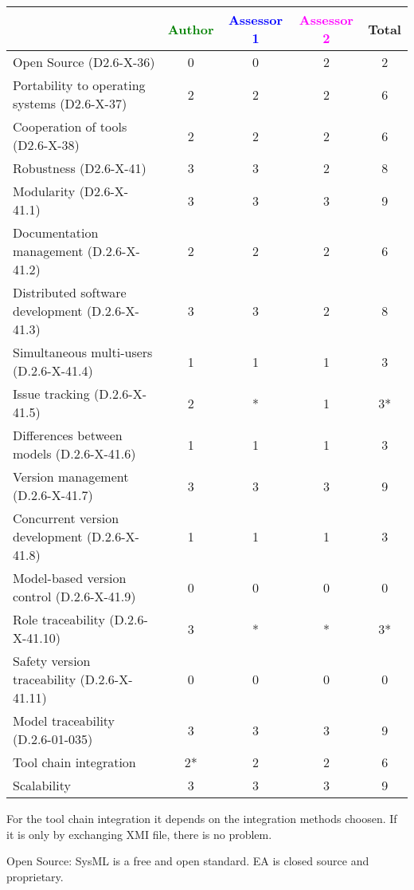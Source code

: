 \begin{tabular}{|l | c | c | c | c|}
\hline
& \textcolor{green}{Author} & \textcolor{blue}{Assessor 1} & \textcolor{magenta}{Assessor 2} & Total \\
\hline 
Open Source (D2.6-X-36) &0 & 0& 2& 2  \\
\hline 
Portability to operating systems (D2.6-X-37) &2 & 2& 2 & 6  \\
\hline
Cooperation of tools (D2.6-X-38) &2 & 2&2 & 6  \\
\hline
Robustness (D2.6-X-41) &3 &3 &2 & 8 \\
\hline
Modularity (D2.6-X-41.1) &3 &3 &3 & 9 \\
\hline
Documentation management (D.2.6-X-41.2) & 2& 2&2 & 6 \\
\hline
Distributed software development (D.2.6-X-41.3)  &3 & 3&2 & 8 \\
\hline
Simultaneous multi-users (D.2.6-X-41.4)   &1 & 1&1 & 3 \\
\hline
Issue tracking (D.2.6-X-41.5) &2 & *& 1& 3* \\
\hline
Differences between models (D.2.6-X-41.6) &1 & 1&1 & 3 \\
\hline
Version management (D.2.6-X-41.7) &3 & 3& 3& 9 \\
\hline
Concurrent version development (D.2.6-X-41.8) &1 & 1& 1& 3 \\
\hline
Model-based version control (D.2.6-X-41.9) &0 & 0& 0& 0 \\
\hline
Role traceability (D.2.6-X-41.10) & 3& *& * & 3* \\
\hline
Safety version traceability (D.2.6-X-41.11) &0 &0 & 0& 0 \\
\hline
Model traceability (D.2.6-01-035) &3 & 3&3 & 9 \\
\hline
Tool chain integration &2* & 2& 2 & 6 \\
\hline
Scalability &3 & 3&3 & 9 \\
\hline
\end{tabular}
\begin{author_comment}
For the tool chain integration it depends on the integration methods
choosen. If it is only by exchanging XMI file, there is no problem.
\end{author_comment}

\begin{assessor2}
Open Source: SysML is a free and open standard. EA is closed source and proprietary.

\end{assessor2}


